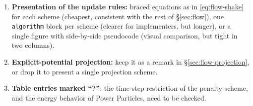 \documentclass[main.tex]{subfiles}
\begin{document}
\begin{enumerate}
  \item \textbf{Presentation of the update rules:} braced equations as in \eqref{eq:flow-shake} for each scheme (cheapest, consistent with the rest of \S\ref{sec:flow}), one \texttt{algorithm} block per scheme (clearer for implementers, but longer), or a single figure with side-by-side pseudocode (visual comparison, but tight in two columns).
  \item \textbf{Explicit-potential projection:} keep it as a remark in \S\ref{sec:flow-projection}, or drop it to present a single projection scheme.
  \item \textbf{Table entries marked ``?''}: the time-step restriction of the penalty scheme, and the energy behavior of Power Particles, need to be checked.
\end{enumerate}
\end{document}
